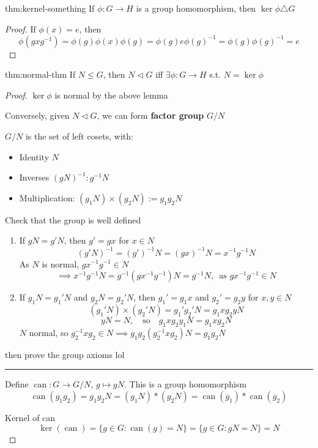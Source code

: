 \documentclass{article}
\DeclareMathOperator{\can}{can}
\begin{document}
\begin{thm}[lma]{thm:kernel-something}{}
    If $\phi : G \to H$ is a group homomorphism, then $\ker \phi \triangle G$
\end{thm}

\begin{proof}
    If $\phi(x) = e$, then
    \[\phi(gxg^{-1}) = \phi(g)\phi(x)\phi(g) = \phi(g) e \phi(g)^{-1} = \phi(g)\phi(g)^{-1} = e\]
\end{proof}

\begin{thm}[]{thm:normal-thm}{}
    If $N \le G$, then $N \triangleleft G$ iff $\exists \phi : G \to H$ s.t. $N = \ker \phi$
\end{thm}

\begin{proof}
    $\ker \phi$ is normal by the above lemma
    
    Conversely, given $N \triangleleft G$, we can form \textbf{factor group} $G /N$

    $G /N$ is the set of left cosets, with:
    \begin{itemize}
        \item Identity $N$
        \item Inverses $(gN)^{-1} : g^{-1}N$
        \item Multiplication: $(g_{1}N) \times (g_{2}N) := g_{1}g_{2}N$
    \end{itemize}

    Check that the group is well defined
    \begin{enumerate}
        \item If $gN = g'N$, then $g' = gx$ for $x\in N$
            \[(g'N)^{-1} = (g')^{-1}N = (gx)^{-1}N = x^{-1}g^{-1}N\]
            As $N$ is normal, $gx^{-1}g^{-1}\in N$
            \[\implies x^{-1}g^{-1}N = g^{-1}(gx^{-1}g^{-1})N = g^{-1}N,\,\text{ as } gx^{-1}g^{-1}\in N\]
        \item If $g_{1}N = g_{1}'N$ and $g_{2}N = g_{2}'N$, then $g_{1}' = g_{1}x$ and $g_{2}' = g_{2}y$ for $x, y\in N$
            \[(g_{1}'N) \times (g_{2}'N) = g_{1}'g_{2}'N = g_{1}x g_{2}yN\]
            \[yN = N,\quad\text{so}\quad g_{1}xg_{2}y_{1}N = g_{1}xg_{2}N\]
            $N$ normal, so $g_{2}^{-1} x g_{2}\in N \implies g_{1}g_{2}(g_{2}^{-1}xg_{2})N = g_{1}g_{2}N$
    \end{enumerate}

    then prove the group axioms lol

    \vspace{-3pt}
    \noindent\rule{\textwidth}{0.08ex}

    Define $\can : G \to G / N$, $g \mapsto gN$. This is a group homomorphism
    \[\can(g_{1}g_{2}) = g_{1}g_{2}N = (g_{1}N) * (g_{2}N) = \can(g_{1}) * \can(g_{2})\]

    Kernel of can
    \[\ker(\can) = \{g\in G : \can(g) = N\} = \{g\in G : gN = N\} = N\]
\end{proof}
\end{document}
